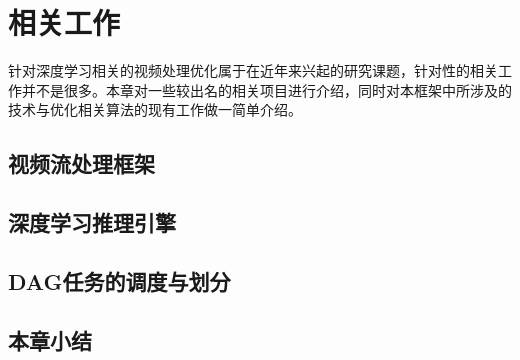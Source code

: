 
\chapter{相关工作}\label{related_work}
针对深度学习相关的视频处理优化属于在近年来兴起的研究课题，针对性的相关工作并不是很多。本章对一些较出名的相关项目进行介绍，同时对本框架中所涉及的技术与优化相关算法的现有工作做一简单介绍。

\section{视频流处理框架}

\section{深度学习推理引擎}

\section{DAG任务的调度与划分}

\section{本章小结}
